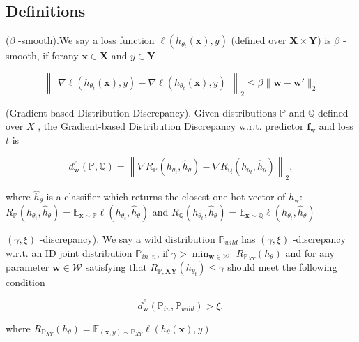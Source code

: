 \subsection{Definitions}
\begin{definition} \label{definition-beta-smooth}
($\beta$ -smooth).We say a loss function $\ell(h_{\theta_t}(\mathbf{x}),y)$ (defined over $\boldsymbol{X}\times\boldsymbol{Y})$ is $\beta$ -smooth, if forany $\mathbf{x}\in{\boldsymbol{X}}$ and $y\in\boldsymbol{Y}$

$$\begin{Vmatrix}\nabla\ell(h_{\theta_t}(\mathbf{x}),y)-\nabla\ell(h_{\theta_t}(\mathbf{x}),y)\end{Vmatrix}_2\leq\beta\|\mathbf{w}-\mathbf{w}'\|_2$$
\end{definition}

\begin{definition}\label{definition-gradient-based-discrepancy}
    (Gradient-based Distribution Discrepancy). Given distributions $\mathbb{P}$ and $\mathbb{Q}$ defined over $X$ , the Gradient-based Distribution Discrepancy w.r.t. predictor $\mathbf{f}_{\mathrm{w}}$ and loss $t$ is

$$d_{\mathbf{w}}^{\ell}(\mathbb{P},\mathbb{Q})=\left\|\nabla R_{\mathbb{P}}(h_{\theta_t},\widehat{h}_{\theta})-\nabla R_{\mathbb{Q}}(h_{\theta_t},\widehat{h}_{\theta})\right\|_{2},$$

where $\widehat{h}_{\theta}$ is a classifier which returns the closest one-hot vector of $h_{\mathrm{w}}$: $R_{\mathbb{P}}(h_{\theta_t},\widehat{h}_{\theta})=\mathbb{E}_{\mathbf{x}\sim\mathbb{P}}\ell(h_{\theta_t},\widehat{h}_{\theta})$ and $R_{\mathbb{Q}}(h_{\theta_t},\widehat{h}_{\theta})=\mathbb{E_{\mathbf{x}\sim\mathbb{Q}}}\ell(h_{\theta_t},\widehat{h}_{\theta})$
\end{definition}

\begin{definition}\label{definition-gamma-discrepancy}
$(\gamma,\xi)$ -discrepancy). We say a wild distribution $\mathbb{P}_{wild}$ has $(\gamma,\xi)$ -discrepancy w.r.t. an ID joint distribution $\mathbb{P}_{in}$ $_{n}$, if $\gamma > \min _{\mathbf{w} \in \mathcal{W} }$ $R_{\mathbb{P} _{XY}}( h_{\theta})$ and for any parameter $\mathbf{w}\in\mathcal{W}$ satisfying that $R_{\mathbb{P},\boldsymbol{X}\boldsymbol{Y}}(h_{\theta_t})\leq\gamma$ should meet the following condition

$$d_{\mathbf{w}}^{\ell}(\mathbb{P}_{in},\mathbb{P}_{wild})>\xi,$$

where $R_{\mathrm{P} _{XY}}( h_{\theta}) = \mathbb{E} _{( \mathbf{x} , y) \sim \mathbb{P} _{XY}}\ell ( h_{\theta}( \mathbf{x} ) , y)$
\end{definition}



